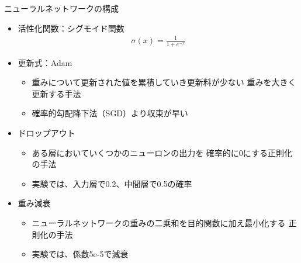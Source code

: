\documentclass[aspectratio=43,unicode,10pt]{beamer}
\begin{document}
\begin{frame}{ニューラルネットワークの構成}{}
  \begin{itemize}
    \item 活性化関数：シグモイド関数
      \begin{gather*}
        \sigma(x) = \frac{1}{1 + e^{-x}}
      \end{gather*}
    \item 更新式：Adam
      \begin{itemize}
        \item 重みについて更新された値を累積していき更新料が少ない
              重みを大きく更新する手法
        \item 確率的勾配降下法（SGD）より収束が早い
      \end{itemize}
    \item ドロップアウト
      \begin{itemize}
        \item ある層においていくつかのニューロンの出力を
              確率的に0にする正則化の手法
        \item 実験では、入力層で0.2、中間層で0.5の確率
      \end{itemize}
    \item 重み減衰
      \begin{itemize}
        \item ニューラルネットワークの重みの二乗和を目的関数に加え最小化する
              正則化の手法
        \item 実験では、係数5e-5で減衰
      \end{itemize}
  \end{itemize}
\end{frame}
\end{document}
